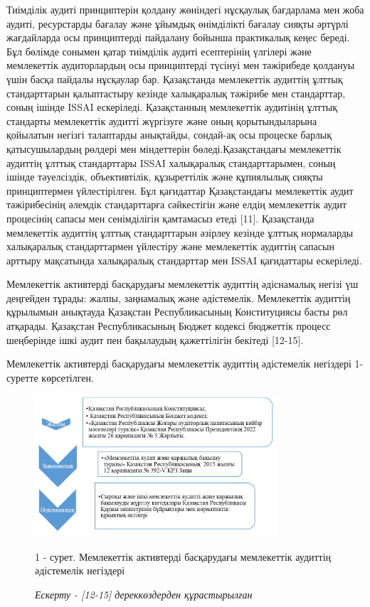 \begin{multicols}{2}
Тиімділік аудиті принциптерін қолдану жөніндегі нұсқаулық бағдарлама мен
жоба аудиті, ресурстарды бағалау және ұйымдық өнімділікті бағалау сияқты
әртүрлі жағдайларда осы принциптерді пайдалану бойынша практикалық кеңес
береді. Бұл бөлімде сонымен қатар тиімділік аудиті есептерінің үлгілері
және мемлекеттік аудиторлардың осы принциптерді түсінуі мен тәжірибеде
қолдануы үшін басқа пайдалы нұсқаулар бар. Қазақстанда мемлекеттік
аудиттің ұлттық стандарттарын қалыптастыру кезінде халықаралық тәжірибе
мен стандарттар, соның ішінде ISSAI ескеріледі. Қазақстанның мемлекеттік
аудитінің ұлттық стандарты мемлекеттік аудитті жүргізуге және оның
қорытындыларына қойылатын негізгі талаптарды анықтайды, сондай-ақ осы
процеске барлық қатысушылардың рөлдері мен міндеттерін
бөледі.Қазақстандағы мемлекеттік аудиттің ұлттық стандарттары ISSAI
халықаралық стандарттарымен, соның ішінде тәуелсіздік, объективтілік,
құзыреттілік және құпиялылық сияқты принциптермен үйлестірілген. Бұл
қағидаттар Қазақстандағы мемлекеттік аудит тәжірибесінің әлемдік
стандарттарға сәйкестігін және елдің мемлекеттік аудит процесінің сапасы
мен сенімділігін қамтамасыз етеді {[}11{]}. Қазақстанда мемлекеттік
аудиттің ұлттық стандарттарын әзірлеу кезінде ұлттық нормаларды
халықаралық стандарттармен үйлестіру және мемлекеттік аудиттің сапасын
арттыру мақсатында халықаралық стандарттар мен ISSAI қағидаттары
ескеріледі.

Мемлекеттік активтерді басқарудағы мемлекеттік аудиттің әдіснамалық
негізі үш деңгейден тұрады: жалпы, заңнамалық және әдістемелік.
Мемлекеттік аудиттің құрылымын анықтауда Қазақстан Республикасының
Конституциясы басты рөл атқарады. Қазақстан Республикасының Бюджет
кодексі бюджеттік процесс шеңберінде ішкі аудит пен бақылаудың
қажеттілігін бекітеді {[}12-15{]}.

Мемлекеттік активтерді басқарудағы мемлекеттік аудиттің әдістемелік
негіздері 1-суретте көрсетілген.
\end{multicols}

\begin{figure}[H]
	\centering
	\includegraphics[width=0.8\textwidth]{media/ekon/image6}
	\caption*{1 - сурет. Мемлекеттік активтерді басқарудағы мемлекеттік аудиттің әдістемелік негіздері}
	\caption*{\normalfont \emph{Ескерту - {[}12-15{]} дереккөздерден құрастырылған}}
\end{figure}

